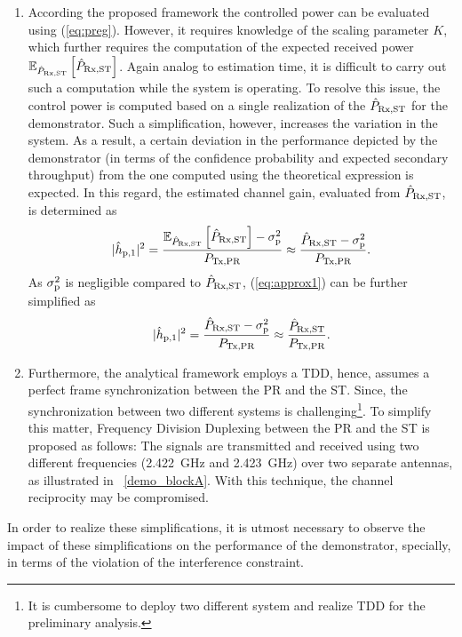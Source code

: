 \begin{enumerate}
	\item According the proposed framework the controlled power can be evaluated using (\ref{eq:preg}). However, it requires knowledge of the scaling parameter $K$, which further requires the computation of the expected received power ${\mathbb E}_{\hat{P}_{\text{Rx,ST}}}\left[ \hat{P}_{\text{Rx,ST}} \right]$. Again analog to estimation time, it is difficult to carry out such a computation while the system is operating. To resolve this issue, the control power is computed based on a single realization of the $\hat{P}_{\text{Rx,ST}}$ for the demonstrator. Such a simplification, however, increases the variation in the system. As a result, a certain deviation in the performance depicted by the demonstrator (in terms of the confidence probability and expected secondary throughput) from the one computed using the theoretical expression is expected. 
In this regard, the estimated channel gain, evaluated from $\hat{P}_{\text{Rx,ST}}$, is determined as 
	\begin{equation}
		|\hat{h}_{\text{p,1}}|^2 = \frac{{\mathbb E}_{\hat{P}_{\text{Rx,ST}}}\left[ \hat{P}_{\text{Rx,ST}} \right]-\sigma^2_{\text{p}}}{P_{\text{Tx,PR}}} \approx \frac{\hat{P}_{\text{Rx,ST}}-\sigma^2_{\text{p}}}{P_{\text{Tx,PR}}}. 
		\label{eq:approx1}
	\end{equation}	
As $\sigma^2_{\text{p}}$ is negligible compared to $\hat{P}_{\text{Rx,ST}}$, (\ref{eq:approx1}) can be further simplified as 
	\begin{equation}
		|\hat{h}_{\text{p,1}}|^2 = \frac{\hat{P}_{\text{Rx,ST}}-\sigma^2_{\text{p}}}{P_{\text{Tx,PR}}} \approx \frac{\hat{P}_{\text{Rx,ST}}}{P_{\text{Tx,PR}}}.
		\label{eq:approx2}
	\end{equation}	
	\item Furthermore, the analytical framework employs a TDD, hence, assumes a perfect frame synchronization between the PR and the ST. Since, the synchronization between two different systems is challenging\footnote{It is cumbersome to deploy two different system and realize TDD for the preliminary analysis.}. To simplify this matter, Frequency Division Duplexing between the PR and the ST is proposed as follows: The signals are transmitted and received using two different frequencies (\SI{2.422}{GHz} and \SI{2.423}{GHz}) over two separate antennas, as illustrated in \figurename~\ref{demo_blockA}. With this technique, the channel reciprocity may be compromised.	
\end{enumerate}
In order to realize these simplifications, it is utmost necessary to observe the impact of these simplifications on the performance of the demonstrator, specially, in terms of the violation of the interference constraint. 
